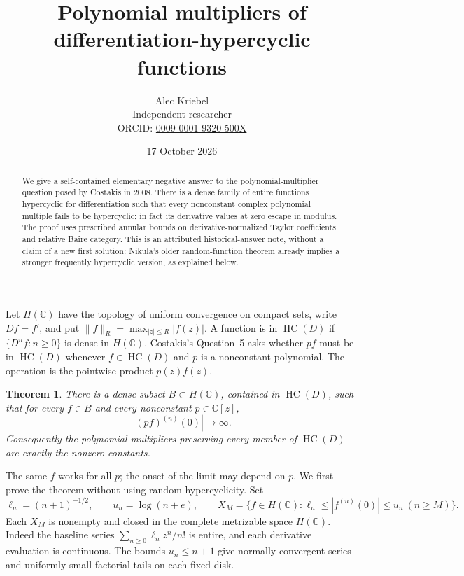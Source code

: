 \documentclass[11pt]{article}
\title{Polynomial multipliers of differentiation-hypercyclic functions}
\author{Alec Kriebel\\
\small Independent researcher\\
\small ORCID: \href{https://orcid.org/0009-0001-9320-500X}{0009-0001-9320-500X}}
\date{17 October 2026}
\newtheorem{theorem}{Theorem}
\newcommand{\HC}{\operatorname{HC}}
\newcommand{\C}{\mathbb C}
\newcommand{\norm}[2]{\lVert #1\rVert_{#2}}
\begin{document}
\maketitle
\begin{abstract}
We give a self-contained elementary negative answer to the polynomial-multiplier
question posed by Costakis in 2008. There is a dense family of entire functions
hypercyclic for differentiation such that every nonconstant complex polynomial
multiple fails to be hypercyclic; in fact its derivative values at zero escape
in modulus. The proof uses prescribed annular bounds on derivative-normalized
Taylor coefficients and relative Baire category. This is an attributed
historical-answer note, without a claim of a new first solution: Nikula's older
random-function theorem already implies a stronger frequently hypercyclic
version, as explained below.
\end{abstract}

Let $H(\C)$ have the topology of uniform convergence on compact sets, write
$Df=f'$, and put $\norm{f}{R}=\max_{|z|\le R}|f(z)|$.
A function is in $\HC(D)$ if $\{D^nf:n\ge0\}$ is dense in $H(\C)$.
Costakis's Question~5 \cite[p.~330]{Costakis} asks whether $pf$ must be in
$\HC(D)$ whenever $f\in\HC(D)$ and $p$ is a nonconstant polynomial.
The operation is the pointwise product $p(z)f(z)$.

\begin{theorem}\label{thm:main}
There is a dense subset $B\subset H(\C)$, contained in $\HC(D)$, such that
for every $f\in B$ and every nonconstant $p\in\C[z]$,
\[
                 |(pf)^{(n)}(0)|\longrightarrow\infty.
\]
Consequently the polynomial multipliers preserving every member of $\HC(D)$
are exactly the nonzero constants.
\end{theorem}

The same $f$ works for all $p$; the onset of the limit may depend on $p$.
We first prove the theorem without using random hypercyclicity.
Set
\[
 \ell_n=(n+1)^{-1/2},\qquad u_n=\log(n+e),\qquad
 X_M=\{f\in H(\C):\ell_n\le |f^{(n)}(0)|\le u_n\ (n\ge M)\}.
\]
Each $X_M$ is nonempty and closed in the complete metrizable space $H(\C)$.
Indeed the baseline series $\sum_{n\ge0}\ell_nz^n/n!$ is entire, and each
derivative evaluation is continuous. The bounds $u_n\le n+1$ give normally
convergent series and uniformly small factorial tails on each fixed disk.
\end{document}
